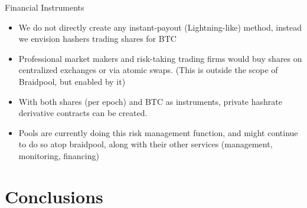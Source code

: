 \documentclass[tikz,mathserif,usenames,dvipsnames,svgnames,table]{beamer}
\newlength{\wideitemsep}
\let\olditem\item
\renewcommand{\item}{\setlength{\itemsep}{\wideitemsep}\olditem}
\begin{document}
\begin{frame}{Financial Instruments}
    \begin{itemize}
        \item We do not directly create any instant-payout (Lightning-like)
            method, instead we envision hashers trading shares for BTC
        \item Professional market makers and risk-taking trading firms would buy
            shares on centralized exchanges or via atomic swaps. (This is
            outside the scope of Braidpool, but enabled by it)
        \item With both shares (per epoch) and BTC as instruments, private
            hashrate derivative contracts can be created.
        \item Pools are currently doing this risk management function, and might
            continue to do so atop braidpool, along with their other services
            (management, monitoring, financing)
    \end{itemize}
\end{frame}
\section{Conclusions}
\end{document}
